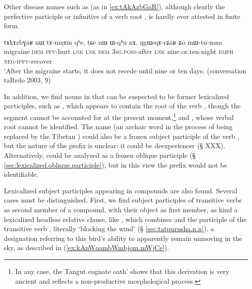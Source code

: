 Other disease names such as  (as in \ref{ex:tAkAzbGaR}), although clearly the perfective participle or infinitive of a verb root , is hardly ever attested in finite form.

\begin{exe}
\ex \label{ex:tAkAzbGaR}
 \gll tɤkɤzbɣaʁ nɯ tɤ-mŋɤm qʰe, tɕe nɯ ɯ-qʰu nɤ, ŋgɯsqɤ-rʑaʁ ʑo mɯ-tu-mna \\
 migraine \textsc{dem} \textsc{pfv}-hurt \textsc{lnk} \textsc{lnk} \textsc{dem} \textsc{3sg}.\textsc{poss}-after \textsc{lnk} nine.or.ten-night \textsc{emph} \textsc{neg}-\textsc{ipfv}-recover \\
\glt `After the migraine starts, it does not recede until nine or ten days. (conversation taRrdo 2003, 9)
\end{exe}

In addition, we find nouns in  that can be suspected to be former lexicalized participles, such as , which appears to contain the root of the verb   , though the segment  cannot be accounted for at the present moment,\footnote{In any case, the Tangut cognate   oath' shows that this derivation is very ancient and reflects a non-productive morphological process. } and , whose verbal root cannot be identified. The name  (an archaic word in the process of being replaced by the Tibetan ) could also be a frozen subject participle  of the verb , but the nature of the prefix  is unclear: it could be deexperiencer (§ XXX). Alternatively,  could be analyzed as a frozen oblique participle (§ \ref{sec:lexicalized.oblique.participle}), but in this view the prefix  would not be identifiable.

Lexicalized subject participles appearing in compounds are also found. Several cases must be distinguished. First, we find subject participles of transitive verbs as second member of a compound, with their object as first member, as kind a lexicalized headless relative clause, like , which combines   and the participle   of the transitive verb , literally `blocking the wind'   (§ \ref{sec:tatpurusha.n.n}), a designation referring to this bird's ability to apparently remain unmoving in the sky, as described in (\ref{ex:kAnWqambWmbjom.mWjCe}).

